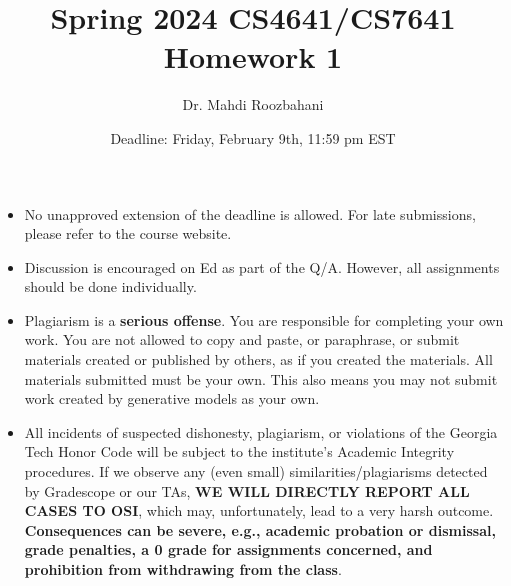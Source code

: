 \documentclass{article}
\title{Spring 2024 CS4641/CS7641 Homework 1}
\author{Dr. Mahdi Roozbahani}
\date{Deadline: Friday, February 9th, 11:59 pm EST}
\begin{document}
\maketitle
\begin{itemize}
    \item No unapproved extension of the deadline is allowed. For late submissions, please refer to the course website.
    \item Discussion is encouraged on Ed as part of the Q/A. However, all assignments should be done individually.
    \item \color{red}Plagiarism is a \textbf{serious offense}. You are responsible for completing your own work. You are not allowed to copy and paste, or paraphrase, or submit materials created or published by others, as if you created the materials. All materials submitted must be your own. This also means you may not submit work created by generative models as your own.\color{black}
    \item \color{red}All incidents of suspected dishonesty, plagiarism, or violations of the Georgia Tech Honor Code will be subject to the institute’s Academic Integrity procedures. If we observe any (even small) similarities/plagiarisms detected by Gradescope or our TAs, \textbf{WE WILL DIRECTLY REPORT ALL CASES TO OSI}, which may, unfortunately, lead to a very harsh outcome. \textbf{Consequences can be severe, e.g., academic probation or dismissal, grade penalties, a 0 grade for assignments concerned, and prohibition from withdrawing from the class}.
\end{itemize}
\end{document}
